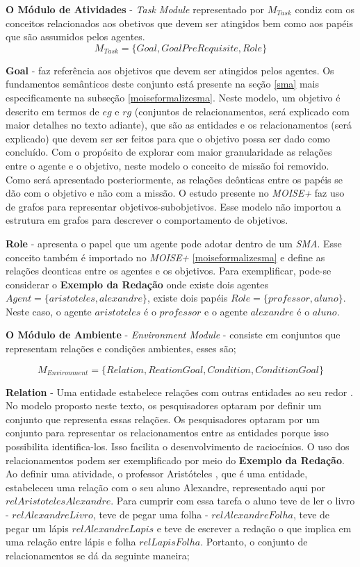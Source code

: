 \textbf{O Módulo de Atividades} - \textit{Task Module} representado por $M_{Task}$ condiz com os conceitos relacionados aos obetivos que devem ser atingidos bem como aos papéis que são assumidos pelos agentes.
\begin{equation}
    M_{Task} = \{ Goal, GoalPreRequisite, Role \}
\end{equation}

\textbf{Goal} - faz referência aos objetivos que devem ser atingidos pelos agentes. Os fundamentos semânticos deste conjunto está presente na seção \ref{sma} mais especificamente na subseção \ref{moiseformalizesma}. Neste modelo, um objetivo é descrito em termos de $eg$ e $rg$ (conjuntos de relacionamentos, será explicado com maior detalhes no texto adiante), que são as entidades e os relacionamentos (será explicado) que devem ser ser feitos para que o objetivo possa ser dado como concluído. Com o propósito de explorar com maior granularidade as relações entre o agente e o objetivo, neste modelo o conceito de missão foi removido. Como será apresentado posteriormente, as relações deônticas entre os papéis se dão com o objetivo e não com a missão. O estudo presente no \textit{MOISE+} faz uso de grafos para representar objetivos-subobjetivos. Esse modelo não importou a estrutura em grafos para descrever o comportamento de objetivos. 

\textbf{Role} - apresenta o papel que um agente pode adotar dentro de um \textit{SMA}. Esse conceito também é importado no \textit{MOISE+} 
\ref{moiseformalizesma} e define as relações deonticas entre os agentes e os objetivos. Para exemplificar, pode-se considerar o \textbf{Exemplo da Redação} onde existe dois agentes $Agent = \{ aristoteles, alexandre \}$, existe dois papéis $Role = \{ professor, aluno\}$. Neste caso, o agente $aristoteles$ é o $professor$ e o agente $alexandre$ é o $aluno$.

\textbf{O Módulo de Ambiente} - \textit{Environment Module} - consiste em conjuntos que representam relações e condições ambientes, esses são;

\begin{equation}
    M_{Environment} = \{ Relation, ReationGoal, Condition, ConditionGoal \}
\end{equation}

\textbf{Relation} - Uma entidade estabelece relações com outras entidades ao seu redor \cite{entity}. No modelo proposto neste texto, 
os pesquisadores optaram por definir um conjunto que representa essas relações. Os pesquisadores optaram por um conjunto para representar
os relacionamentos entre as entidades porque isso possibilita identifica-los. Isso facilita o desenvolvimento de raciocínios. O uso 
dos relacionamentos podem ser exemplificado por meio do \textbf{Exemplo da Redação}. Ao definir uma atividade, o professor Aristóteles
, que é uma entidade, estabeleceu uma relação com o seu aluno Alexandre, representado aqui por $relAristotelesAlexandre$. 
Para cumprir com essa tarefa o aluno teve de ler o livro - $relAlexandreLivro$, teve de pegar uma folha - $relAlexandreFolha$,
teve de pegar um lápis $relAlexandreLapis$ e teve de escrever a redação o que implica em uma relação entre lápis e folha $relLapisFolha$. 
Portanto, o conjunto de relacionamentos se dá da seguinte maneira;

